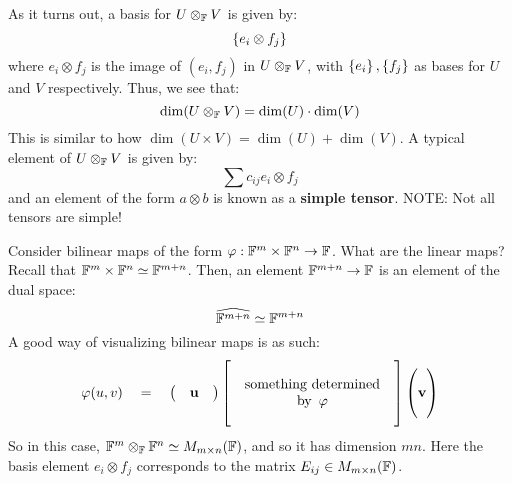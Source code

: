 As it turns out, a basis for $ U \otimes_{\mathbb{F}} V $ is given by:
\begin{equation*}
    \left\{{e_{i} \otimes f_{j}}\right\}
\end{equation*}
where $ e_{i} \otimes f_{j} $ is the image of $ (e_{i}, f_{j}) $ in
$ U \otimes_{\mathbb{F}} V $, with $ \left\{{e_{i}}\right\}, \left\{{f_{j}}\right\} $ as bases for
$ U $ and $ V $ respectively. Thus, we see that:
\begin{equation*}
    \dim(U\otimes_{\mathbb{F}}V) = \dim(U) \cdot \dim(V)
\end{equation*}
This is similar to how $ \dim(U \times V) = \dim(U) + \dim(V) $.
A typical element of $ U \otimes_{\mathbb{F}} V $ is given by:
\begin{equation*}
    \sum c_{ij}e_{i}\otimes f_{j}
\end{equation*}
and an element of the form $ a \otimes b $ is known as a \textbf{simple tensor}.
NOTE: Not all tensors are simple!

\begin{xmp}[source=Primary Source Material]
    Consider bilinear maps of the form $ \operatorname{\varphi}: \mathbb{F}^{m} \times \mathbb{F}^{n}
    \rightarrow \mathbb{F} $. What are the linear maps? \vsp
    Recall that $ \mathbb{F}^{m} \times \mathbb{F}^{n} \simeq \mathbb{F}^{m+n} $.
    Then, an element $ \mathbb{F}^{m+n} \rightarrow \mathbb{F} $ is an element of the
    dual space:
    \begin{equation*}
        \widehat{\mathbb{F}^{m+n}} \simeq \mathbb{F}^{m+n}
    \end{equation*}
    A good way of visualizing bilinear maps is as such:
    \begin{equation*}
        \operatorname{\varphi}(u, v) \quad = \quad
        \begin{pmatrix}
            & \mathbf{u} &
        \end{pmatrix}
        \begin{bmatrix}
            & & \\
            & \textrm{something determined} & \\
            & \textrm{by } \operatorname{\varphi} & \\
            & &
        \end{bmatrix}
        \begin{pmatrix}
            \ \\ \mathbf{v} \\ \
        \end{pmatrix}
    \end{equation*}
    So in this case, $ \mathbb{F}^{m} \otimes_{\mathbb{F}} \mathbb{F}^{n} \simeq
    M_{m\times n}(\mathbb{F}) $, and so it has dimension $ mn $.
    Here the basis element $ e_{i} \otimes f_{j} $ corresponds to the
    matrix $ E_{ij} \in M_{m\times n}(\mathbb{F}) $.
\end{xmp}

